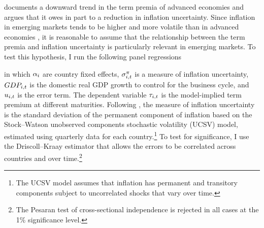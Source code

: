{\cite{Wright:2011} documents a downward trend in the term premia of advanced economies and argues that it
owes in part to a reduction in inflation uncertainty.
Since inflation in emerging markets tends to be higher and more volatile than in advanced economies \citep{HaKoseOhnsorge:2019}, it is reasonable to assume that the relationship between the term premia and inflation uncertainty is particularly %
relevant in emerging markets. %
To test this hypothesis, I run the following panel regressions 

\noindent in which \(\alpha_{i}\) are country fixed effects, \(\sigma^{\pi}_{i,t}\) is a measure of inflation uncertainty,
\(GDP_{i,t}\) is the domestic real GDP growth to control for the business cycle, 
and \(u_{i,t}\) is the error term. 
The dependent variable \(\tau_{i,t}\) is the model-implied term premium at different maturities.
Following \cite{Wright:2011}, the measure of inflation uncertainty is the standard deviation of the permanent component of inflation based on the Stock--Watson unobserved components stochastic volatility (UCSV) model, estimated using quarterly data for each country.\footnote{ The UCSV model assumes that inflation has permanent and transitory components subject to uncorrelated shocks that vary over time.}
To test for significance, I use the Driscoll--Kraay estimator that allows the errors to be correlated across countries and over time.\footnote{ The Pesaran test of cross-sectional independence is rejected in all cases at the 1\% significance level.}

}
